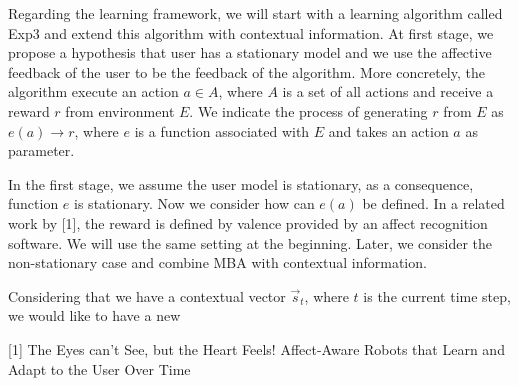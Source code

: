 \documentclass{book}
\begin{document}
Regarding the learning framework, we will start with a learning algorithm called Exp3 and extend this algorithm with contextual information. At first stage, we propose a hypothesis that user has a stationary model and we use the affective feedback of the user to be the feedback of the algorithm. More concretely, the algorithm execute an action $a\in A$, where $A$ is a set of all actions and receive a reward $r$ from environment $E$. We indicate the process of generating $r$ from $E$ as $e(a) \rightarrow r$, where $e$ is a function associated with $E$ and takes an action $a$ as parameter.

In the first stage, we assume the user model is stationary, as a consequence, function $e$ is stationary. Now we consider how can $e(a)$ be defined. In a related work by [1], the reward is defined by valence provided by an affect recognition software. We will use the same setting at the beginning. Later, we consider the non-stationary case and combine MBA with contextual information.

Considering that we have a contextual vector $\vec{s}_t$, where $t$ is the current time step, we would like to have a new 


[1] The Eyes can’t See, but the Heart Feels! Affect-Aware Robots that Learn and Adapt to the User Over Time
\end{document}
